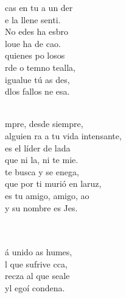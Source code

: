 \documentclass[12pt]{article}
\begin{document}
\begin{multicols*}{2}
\begin{cancion}%
	cas en tu a un der \\
	e la llene senti.\\
	No edes ha esbro\\
	loue ha de  cao.\\
\jump
	quienes po losos  \\
	rde o temno tealla,\\
	igualue tú as des,\\
	dlos fallos ne esa.\\\jump\\
	\begin{chorus}%
	mpre, desde siempre,\\
	alguien ra a tu vida intensante,\\
	es el líder de lada\\
	que ni la, ni te mie.\\
\jump
	 te busca y se enega,\\
	que por ti murió en laruz,\\
	es tu amigo, amigo, ao\\
	y su nombre es Jes.\\
	\end{chorus}%
	\jump\\
	      \\
	á unido as humes, \\
	l que sufrive cca,\\
	recza al que seale\\
	yl egoí condena.\\

\end{cancion}
\end{multicols*}
\end{document}

